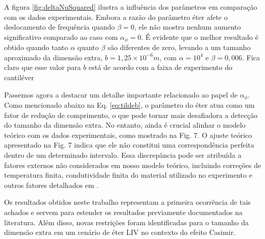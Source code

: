 A figura \eqref{fig:deltaNuSquared} ilustra a influência dos parâmetros em comparação com os dados experimentais. Embora a razão do parâmetro éter afete o deslocamento de frequência quando $\beta=0$, ele não mostra nenhum aumento significativo comparado ao caso com $\alpha_\phi=0$. É evidente que o melhor resultado é obtido quando tanto $\alpha$ quanto $\beta$ são diferentes de zero, levando a um tamanho aproximado da dimensão extra, $b = 1,25 \times 10^{-6} m$, com $\alpha = 10^4$ e $\beta=0,006$. Fica claro que esse valor para $b$ está de acordo com a faixa de experimento do cantiléver \cite{MurataTanaka2015}

Passemos agora a destacar um detalhe importante relacionado ao papel de $\alpha_\phi$. Como mencionado abaixo na Eq. \eqref{eq:tildeb}, o parâmetro do éter atua como um fator de redução de comprimento, o que pode tornar mais desafiadora a detecção do tamanho da dimensão extra. No entanto, ainda é crucial alinhar o modelo teórico com os dados experimentais, como mostrado na Fig. 7. O ajuste teórico apresentado na Fig. 7 indica que ele não constitui uma correspondência perfeita dentro de um determinado intervalo. Essa discrepância pode ser atribuída a fatores externos não considerados em nosso modelo teórico, incluindo correções de temperatura finita, condutividade finita do material utilizado no experimento e outros fatores detalhados em \cite{Bressi2002}.

Os resultados obtidos neste trabalho representam a primeira ocorrência de tais achados e servem para estender os resultados previamente documentados na literatura. Além disso, novas restrições foram identificadas para o tamanho da dimensão extra em um cenário de éter LIV no contexto do efeito Casimir.